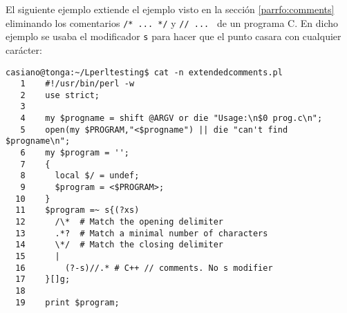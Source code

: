 El siguiente ejemplo extiende el ejemplo visto en
la sección
\ref{parrfo:comments}
eliminando los comentarios \verb|/* ... */| y \verb|// ... |
de un programa C. En dicho ejemplo se usaba el modificador \verb|s| 
para hacer que el punto casara con cualquier carácter:

\begin{latexonly}
\begin{verbatim}
casiano@tonga:~/Lperltesting$ cat -n extendedcomments.pl
   1    #!/usr/bin/perl -w
   2    use strict;
   3  
   4    my $progname = shift @ARGV or die "Usage:\n$0 prog.c\n";
   5    open(my $PROGRAM,"<$progname") || die "can't find $progname\n";
   6    my $program = '';
   7    {
   8      local $/ = undef;
   9      $program = <$PROGRAM>;
  10    }
  11    $program =~ s{(?xs)
  12      /\*  # Match the opening delimiter
  13      .*?  # Match a minimal number of characters
  14      \*/  # Match the closing delimiter
  15      |
  16        (?-s)//.* # C++ // comments. No s modifier
  17    }[]g;
  18  
  19    print $program;
\end{verbatim}
\end{latexonly}
